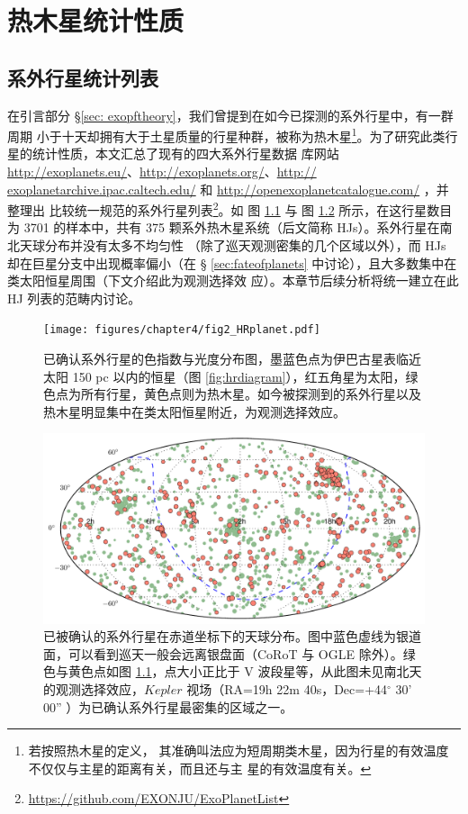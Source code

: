 \chapter{热木星统计性质} \label{chapter:data_stat}

\section{系外行星统计列表}

在引言部分 \S \ref{sec: exopftheory}，我们曾提到在如今已探测的系外行星中，有一群周期
小于十天却拥有大于土星质量的行星种群，被称为热木星\footnote{若按照热木星的定义，
其准确叫法应为短周期类木星，因为行星的有效温度不仅仅与主星的距离有关，而且还与主
星的有效温度有关。}。为了研究此类行星的统计性质，本文汇总了现有的四大系外行星数据
库网站 \url{http://exoplanets.eu/}、\url{http://exoplanets.org/}、\url{http://
exoplanetarchive.ipac.caltech.edu/} 和 \url{http://openexoplanetcatalogue.com/} ，并整理出
比较统一规范的系外行星列表\footnote{\url{https://github.com/EXONJU/ExoPlanetList}}。如
图 \ref{fig:hrplanet} 与 图 \ref{fig:exoskydist} 所示，在这行星数目为 3701 的样本中，共有 
375 颗系外热木星系统（后文简称 HJs）。系外行星在南北天球分布并没有太多不均匀性
（除了巡天观测密集的几个区域以外），而 HJs 却在巨星分支中出现概率偏小（在 \S 
\ref{sec:fateofplanets} 中讨论），且大多数集中在类太阳恒星周围（下文介绍此为观测选择效
应）。本章节后续分析将统一建立在此 HJ 列表的范畴内讨论。

\begin{figure}
\centering
\texttt{[image: figures/chapter4/fig2\_HRplanet.pdf]}
\caption{已确认系外行星的色指数与光度分布图，墨蓝色点为伊巴古星表临近太阳 150 pc 以内的恒星（图 \ref{fig:hrdiagram}），红五角星为太阳，绿色点为所有行星，黄色点则为热木星。如今被探测到的系外行星以及热木星明显集中在类太阳恒星附近，为观测选择效应。}
\label{fig:hrplanet}
\end{figure}


\begin{figure}
\centering
\includegraphics[width=1.0\textwidth]{figures/chapter4/fig1_exodistmollweide.pdf}
\caption{已被确认的系外行星在赤道坐标下的天球分布。图中蓝色虚线为银道面，可以看到巡天一般会远离银盘面（CoRoT 与 OGLE 除外）。绿色与黄色点如图 \ref{fig:hrplanet}，点大小正比于 V 波段星等，从此图未见南北天的观测选择效应，$Kepler$ 视场（RA=19h 22m 40s，Dec=+44$^\circ$ 30' 00'' ）为已确认系外行星最密集的区域之一。}
\label{fig:exoskydist}
\end{figure}


